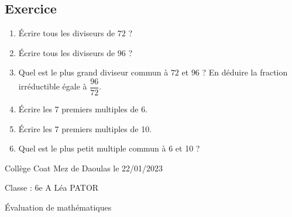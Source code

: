 \documentclass[a4paper,12pt,fleqn]{article}
\newcounter{exo}          				%
\newcommand{\exo}{					%
  	\stepcounter{exo}        			%
  	\subsection*{Exercice \no{}\theexo}}
\newcommand{\titreitem}[1]{
\Ovalbox{\makebox[.99\linewidth][l]{{Compétence : {#1} }}}
\vspace{0.3cm}} %
\begin{document}
\medskip
\begin{minipage}{0.99\linewidth}

\exo



\begin{enumerate}

\item Écrire tous les diviseurs de $72$ ?

\item Écrire tous les diviseurs de $96$ ?

\item Quel est le plus grand diviseur commun à $72$ et $96$ ? En déduire la fraction irréductible égale à $\dfrac{96}{72}$.

\item Écrire les 7 premiers multiples de 6.

\item Écrire les 7 premiers multiples de 10.

\item Quel est le plus petit multiple commun à 6 et 10 ? 


\end{enumerate}

\end{minipage}

\vspace{0.5cm}

\medskip
\newpage
\setcounter{exo}{0}


Collège Coat Mez de Daoulas  \hfill  le 22/01/2023

Classe : 6e A \hfill Léa PATOR

\begin{center}
\begin{LARGE} Évaluation de mathématiques \end{LARGE}
\end{center}

\end{document}
